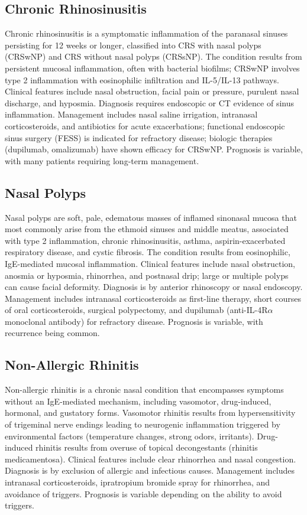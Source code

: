 \subsection{Chronic Rhinosinusitis}
\label{sec:Chronic Rhinosinusitis}
Chronic rhinosinusitis is a symptomatic inflammation of the paranasal sinuses persisting for 12 weeks or longer, classified into CRS with nasal polyps (CRSwNP) and CRS without nasal polyps (CRSsNP). The condition results from persistent mucosal inflammation, often with bacterial biofilms; CRSwNP involves type 2 inflammation with eosinophilic infiltration and IL-5/IL-13 pathways. Clinical features include nasal obstruction, facial pain or pressure, purulent nasal discharge, and hyposmia. Diagnosis requires endoscopic or CT evidence of sinus inflammation. Management includes nasal saline irrigation, intranasal corticosteroids, and antibiotics for acute exacerbations; functional endoscopic sinus surgery (FESS) is indicated for refractory disease; biologic therapies (dupilumab, omalizumab) have shown efficacy for CRSwNP. Prognosis is variable, with many patients requiring long-term management.

\subsection{Nasal Polyps}
\label{sec:Nasal Polyps}
Nasal polyps are soft, pale, edematous masses of inflamed sinonasal mucosa that most commonly arise from the ethmoid sinuses and middle meatus, associated with type 2 inflammation, chronic rhinosinusitis, asthma, aspirin-exacerbated respiratory disease, and cystic fibrosis. The condition results from eosinophilic, IgE-mediated mucosal inflammation. Clinical features include nasal obstruction, anosmia or hyposmia, rhinorrhea, and postnasal drip; large or multiple polyps can cause facial deformity. Diagnosis is by anterior rhinoscopy or nasal endoscopy. Management includes intranasal corticosteroids as first-line therapy, short courses of oral corticosteroids, surgical polypectomy, and dupilumab (anti-IL-4R$\alpha$ monoclonal antibody) for refractory disease. Prognosis is variable, with recurrence being common.

\subsection{Non-Allergic Rhinitis}
\label{sec:Non-Allergic Rhinitis}
Non-allergic rhinitis is a chronic nasal condition that encompasses symptoms without an IgE-mediated mechanism, including vasomotor, drug-induced, hormonal, and gustatory forms. Vasomotor rhinitis results from hypersensitivity of trigeminal nerve endings leading to neurogenic inflammation triggered by environmental factors (temperature changes, strong odors, irritants). Drug-induced rhinitis results from overuse of topical decongestants (rhinitis medicamentosa). Clinical features include clear rhinorrhea and nasal congestion. Diagnosis is by exclusion of allergic and infectious causes. Management includes intranasal corticosteroids, ipratropium bromide spray for rhinorrhea, and avoidance of triggers. Prognosis is variable depending on the ability to avoid triggers.

